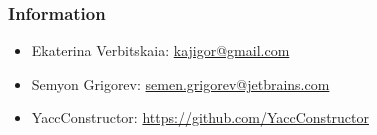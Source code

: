 \documentclass{beamer}
\begin{document}
\begin{frame}
\transwipe[direction=90]
\frametitle{Information}
\begin{itemize}
  \item Ekaterina Verbitskaia: \href{mailto:kajigor@gmail.com}{kajigor@gmail.com}
  \item Semyon Grigorev: \href{mailto:semen.grigorev@jetbrains.com}{semen.grigorev@jetbrains.com}
  \item YaccConstructor: \href{https://github.com/YaccConstructor}{https://github.com/YaccConstructor}
\end{itemize}
\end{frame}
\end{document}
